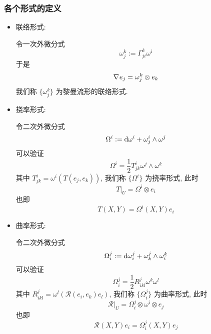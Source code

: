     \subsubsection{各个形式的定义}
        \begin{itemize}
            \item 联络形式:
            
            令一次外微分式
            \begin{equation*}
                \omega_{j}^{k} := \Gamma_{ji}^{k}\omega^i
            \end{equation*}
            于是
            \begin{equation*}
                \nabla_{}{e_j} = \omega_{j}^{k}\otimes e_k
            \end{equation*}
            我们称 $\{\omega_{j}^{k}\}$ 为黎曼流形的联络形式.
            \item 挠率形式:
            
            令二次外微分式
            \begin{equation*}
                \Omega^i := {\rm d}{\omega^i} + \omega^{i}_{j}\wedge\omega^j
            \end{equation*}
            可以验证
            \begin{equation*}
                \Omega^i = \frac{1}{2}T_{jk}^{i}\omega^j\wedge\omega^k
            \end{equation*}
            其中 $T_{jk}^{i}=\omega^i\left(T\left(e_j,e_k\right)\right)$, 我们称 $\{\Omega^i\}$ 为挠率形式, 此时
            \begin{equation*}
                T\big|_U = \Omega^i\otimes e_i
            \end{equation*}
            也即
            \begin{equation*}
                T(X,Y) = \Omega^i(X,Y)e_i
            \end{equation*}
            \item 曲率形式:
            
            令二次外微分式
            \begin{equation*}
                \Omega^{j}_{i} := {\rm d}\omega^{j}_{i} + \omega^{j}_{k}\wedge\omega^{k}_{i}
            \end{equation*}
            可以验证
            \begin{equation*}
                \Omega^{j}_{i} = \frac{1}{2}R_{ikl}^{j}\omega^k\omega^l
            \end{equation*}
            其中 $R_{ikl}^{j} = \omega^l\left(\mathcal{R}(e_i,e_k)e_l\right)$, 我们称 $\{\Omega^j_i\}$ 为曲率形式, 此时
            \begin{equation*}
                \mathcal{R}\big|_U = \Omega^j_i\otimes\omega^i\otimes e_j
            \end{equation*}
            也即
            \begin{equation*}
                \mathcal{R}(X,Y)e_i = \Omega^j_i(X,Y)e_j
            \end{equation*}
        \end{itemize}

